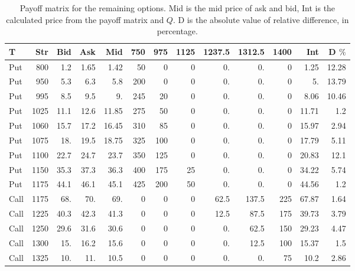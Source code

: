 \documentclass{article}
\begin{document}
\begin{table}[h]
    \centering
    \caption{\label{payoff_reaminaing}
        Payoff matrix for the remaining options.
        Mid is the mid price of ask and bid,
        Int is the calculated price from the payoff matrix and $Q$.
        D is the absolute value of relative difference, in percentage.}
    \small
    \begin{tabular}{lrrrrrrrrrrrr}
        \toprule
        T    & Str  & Bid  & Ask  & Mid   & 750 & 975 & 1125 & 1237.5 & 1312.5 & 1400 & Int   & D $\%$ \\
        \midrule
        Put  & 800  & 1.2  & 1.65 & 1.42  & 50  & 0   & 0    & 0.     & 0.     & 0    & 1.25  & 12.28  \\
        Put  & 950  & 5.3  & 6.3  & 5.8   & 200 & 0   & 0    & 0.     & 0.     & 0    & 5.    & 13.79  \\
        Put  & 995  & 8.5  & 9.5  & 9.    & 245 & 20  & 0    & 0.     & 0.     & 0    & 8.06  & 10.46  \\
        Put  & 1025 & 11.1 & 12.6 & 11.85 & 275 & 50  & 0    & 0.     & 0.     & 0    & 11.71 & 1.2    \\
        Put  & 1060 & 15.7 & 17.2 & 16.45 & 310 & 85  & 0    & 0.     & 0.     & 0    & 15.97 & 2.94   \\
        Put  & 1075 & 18.  & 19.5 & 18.75 & 325 & 100 & 0    & 0.     & 0.     & 0    & 17.79 & 5.11   \\
        Put  & 1100 & 22.7 & 24.7 & 23.7  & 350 & 125 & 0    & 0.     & 0.     & 0    & 20.83 & 12.1   \\
        Put  & 1150 & 35.3 & 37.3 & 36.3  & 400 & 175 & 25   & 0.     & 0.     & 0    & 34.22 & 5.74   \\
        Put  & 1175 & 44.1 & 46.1 & 45.1  & 425 & 200 & 50   & 0.     & 0.     & 0    & 44.56 & 1.2    \\
        Call & 1175 & 68.  & 70.  & 69.   & 0   & 0   & 0    & 62.5   & 137.5  & 225  & 67.87 & 1.64   \\
        Call & 1225 & 40.3 & 42.3 & 41.3  & 0   & 0   & 0    & 12.5   & 87.5   & 175  & 39.73 & 3.79   \\
        Call & 1250 & 29.6 & 31.6 & 30.6  & 0   & 0   & 0    & 0.     & 62.5   & 150  & 29.23 & 4.47   \\
        Call & 1300 & 15.  & 16.2 & 15.6  & 0   & 0   & 0    & 0.     & 12.5   & 100  & 15.37 & 1.5    \\
        Call & 1325 & 10.  & 11.  & 10.5  & 0   & 0   & 0    & 0.     & 0.     & 75   & 10.2  & 2.86   \\

\end{tabular}
\end{table}
\end{document}
